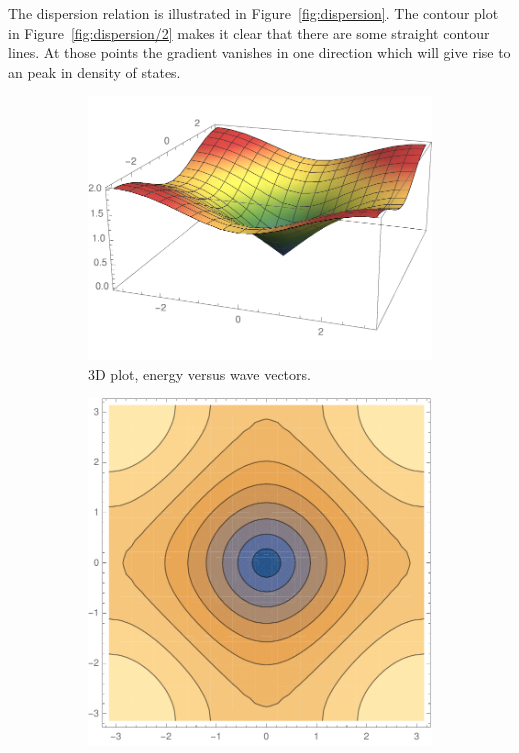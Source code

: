 \documentclass[11pt, english, fleqn, DIV=15, headinclude, BCOR=1cm]{scrartcl}
\begin{document}
The dispersion relation is illustrated in Figure~\ref{fig:dispersion}. The
contour plot in Figure~\ref{fig:dispersion/2} makes it clear that there are
some straight contour lines. At those points the gradient vanishes in one
direction which will give rise to an peak in density of states.

\begin{figure}
    \centering
    \begin{subfigure}[c]{0.48\linewidth}
        \centering
        \includegraphics[width=\linewidth]{dispersion.pdf}
        \caption{%
            3D plot, energy versus wave vectors.
        }
        \label{fig:dispersion/1}
    \end{subfigure}
    \hfill
    \begin{subfigure}[c]{0.48\linewidth}
        \centering
        \includegraphics[width=\linewidth]{contour.pdf}

\end{subfigure}
\end{figure}
\end{document}
